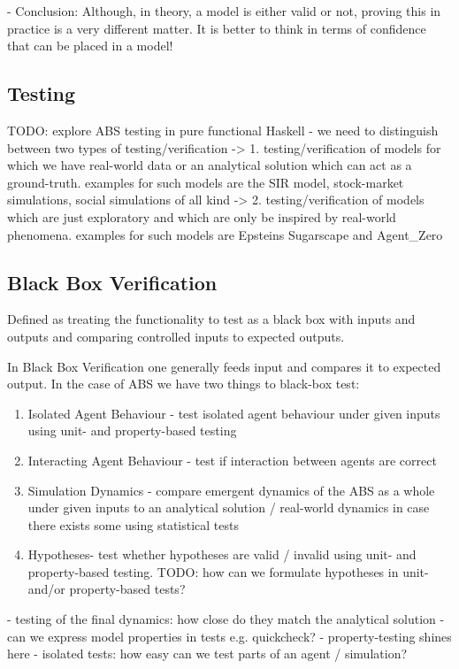 	- Conclusion: Although, in theory, a model is either valid or not, proving this in practice is a very different matter. It is better to think in terms of confidence that can be placed in a model!
	
\subsection{Testing}
TODO: explore ABS testing in pure functional Haskell
- we need to distinguish between two types of testing/verification
	-> 1. testing/verification of models for which we have real-world data or an analytical solution which can act as a ground-truth. examples for such models are the SIR model, stock-market simulations, social simulations of all kind
	-> 2. testing/verification of models which are just exploratory and which are only be inspired by real-world phenomena. examples for such models are Epsteins Sugarscape and Agent\_Zero
	
\subsection{Black Box Verification}
Defined as treating the functionality to test as a black box with inputs and outputs and comparing controlled inputs to expected outputs.

In Black Box Verification one generally feeds input and compares it to expected output. In the case of ABS we have two things to black-box test:
\begin{enumerate}
	\item Isolated Agent Behaviour - test isolated agent behaviour under given inputs using unit- and property-based testing
	\item Interacting Agent Behaviour - test if interaction between agents are correct 
	\item Simulation Dynamics - compare emergent dynamics of the ABS as a whole under given inputs to an analytical solution / real-world dynamics in case there exists some using statistical tests
	\item Hypotheses- test whether hypotheses are valid / invalid using unit- and property-based testing. TODO: how can we formulate hypotheses in unit- and/or property-based tests?
\end{enumerate}

- testing of the final dynamics: how close do they match the analytical solution
- can we express model properties in tests e.g. quickcheck?
- property-testing shines here
- isolated tests: how easy can we test parts of an agent / simulation?

